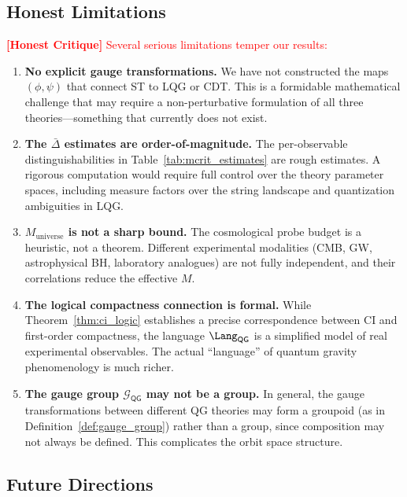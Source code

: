 \documentclass[12pt,a4paper]{article}
\theoremstyle{remark}
\newcommand{\G}{\mathcal{G}}
\newcommand{\CI}{\textsf{CI}}
\newcommand{\QG}{\textsf{QG}}
\newcommand{\honestcrit}[1]{\textcolor{red}{\textbf{[Honest Critique]} #1}}
\begin{document}
\subsection{Honest Limitations}

\honestcrit{Several serious limitations temper our results:}

\begin{enumerate}[leftmargin=*, label=(\arabic*)]
  \item \textbf{No explicit gauge transformations.} We have not constructed the maps $(\phi, \psi)$ that connect ST to LQG or CDT. This is a formidable mathematical challenge that may require a non-perturbative formulation of all three theories---something that currently does not exist.
  \item \textbf{The $\bar{\Delta}$ estimates are order-of-magnitude.} The per-observable distinguishabilities in Table~\ref{tab:mcrit_estimates} are rough estimates. A rigorous computation would require full control over the theory parameter spaces, including measure factors over the string landscape and quantization ambiguities in LQG.
  \item \textbf{$M_{\text{universe}}$ is not a sharp bound.} The cosmological probe budget is a heuristic, not a theorem. Different experimental modalities (CMB, GW, astrophysical BH, laboratory analogues) are not fully independent, and their correlations reduce the effective $M$.
  \item \textbf{The logical compactness connection is formal.} While Theorem~\ref{thm:ci_logic} establishes a precise correspondence between \CI{} and first-order compactness, the language $\Lang_{\QG}$ is a simplified model of real experimental observables. The actual ``language'' of quantum gravity phenomenology is much richer.
  \item \textbf{The gauge group $\G_{\QG}$ may not be a group.} In general, the gauge transformations between different QG theories may form a groupoid (as in Definition~\ref{def:gauge_group}) rather than a group, since composition may not always be defined. This complicates the orbit space structure.
\end{enumerate}

\subsection{Future Directions}
\end{document}
